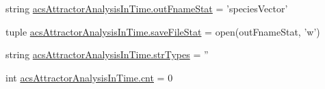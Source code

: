 \begin{DoxyCompactItemize}
\item 
string \hyperlink{a00091_a05e902a00f3333a303563029c80605de}{acs\-Attractor\-Analysis\-In\-Time.\-out\-Fname\-Stat} = 'species\-Vector'
\item 
tuple \hyperlink{a00091_a372b8cd0e4d3200958e9c61e3a276fb1}{acs\-Attractor\-Analysis\-In\-Time.\-save\-File\-Stat} = open(out\-Fname\-Stat, 'w')
\item 
string \hyperlink{a00091_a80aeec3ef5cc335351588c6f7c4b76cb}{acs\-Attractor\-Analysis\-In\-Time.\-str\-Types} = ''
\item 
int \hyperlink{a00091_aabada0bdbcd7fb71d37a9310d32f0a28}{acs\-Attractor\-Analysis\-In\-Time.\-cnt} = 0
\end{DoxyCompactItemize}
